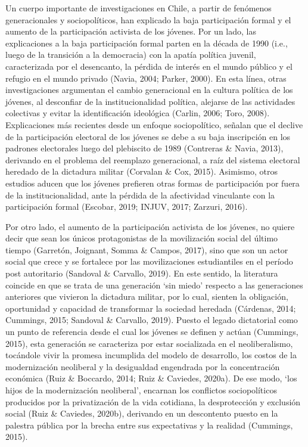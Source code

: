 \documentclass[12pt,twoside]{templates/facsothesis}
\begin{document}
Un cuerpo importante de investigaciones en Chile, a partir de fenómenos generacionales y sociopolíticos, han explicado la baja participación formal y el aumento de la participación activista de los jóvenes. Por un lado, las explicaciones a la baja participación formal parten en la década de 1990 (i.e., luego de la transición a la democracia) con la apatía política juvenil, caracterizada por el desencanto, la pérdida de interés en el mundo público y el refugio en el mundo privado (Navia, 2004; Parker, 2000). En esta línea, otras investigaciones argumentan el cambio generacional en la cultura política de los jóvenes, al desconfiar de la institucionalidad política, alejarse de las actividades colectivas y evitar la identificación ideológica (Carlin, 2006; Toro, 2008). Explicaciones más recientes desde un enfoque sociopolítico, señalan que el declive de la participación electoral de los jóvenes se debe a su baja inscripción en los padrones electorales luego del plebiscito de 1989 (Contreras \& Navia, 2013), derivando en el problema del reemplazo generacional, a raíz del sistema electoral heredado de la dictadura militar (Corvalan \& Cox, 2015). Asimismo, otros estudios aducen que los jóvenes prefieren otras formas de participación por fuera de la institucionalidad, ante la pérdida de la afectividad vinculante con la participación formal (Escobar, 2019; INJUV, 2017; Zarzuri, 2016).

Por otro lado, el aumento de la participación activista de los jóvenes, no quiere decir que sean los únicos protagonistas de la movilización social del último tiempo (Garretón, Joignant, Somma \& Campos, 2017), sino que son un actor social que crece y se fortalece por las movilizaciones estudiantiles en el período post autoritario (Sandoval \& Carvallo, 2019). En este sentido, la literatura coincide en que se trata de una generación `sin miedo' respecto a las generaciones anteriores que vivieron la dictadura militar, por lo cual, sienten la obligación, oportunidad y capacidad de transformar la sociedad heredada (Cárdenas, 2014; Cummings, 2015; Sandoval \& Carvallo, 2019). Puesto el legado dictatorial como un punto de referencia desde el cual los jóvenes se definen y actúan (Cummings, 2015), esta generación se caracteriza por estar socializada en el neoliberalismo, tocándole vivir la promesa incumplida del modelo de desarrollo, los costos de la modernización neoliberal y la desigualdad engendrada por la concentración económica (Ruiz \& Boccardo, 2014; Ruiz \& Caviedes, 2020a). De ese modo, `los hijos de la modernización neoliberal', encarnan los conflictos sociopolíticos producidos por la privatización de la vida cotidiana, la desprotección y exclusión social (Ruiz \& Caviedes, 2020b), derivando en un descontento puesto en la palestra pública por la brecha entre sus expectativas y la realidad (Cummings, 2015).
\end{document}
